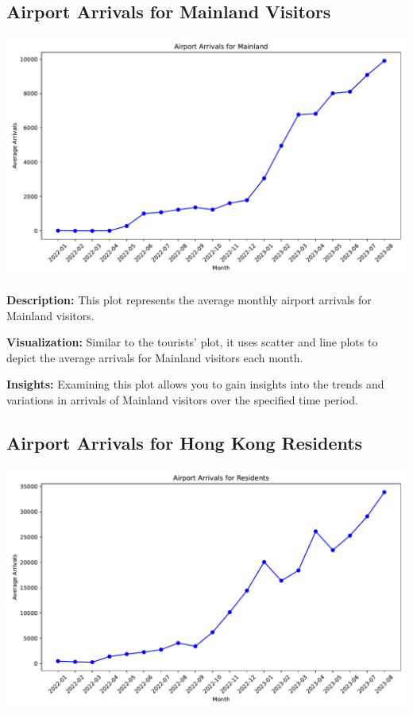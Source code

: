 \documentclass{article}
\begin{document}
\subsection{Airport Arrivals for Mainland Visitors}
\includegraphics[width=\textwidth]{mainland_arrivals.pdf}

\textbf{Description:} This plot represents the average monthly airport arrivals for Mainland visitors.

\textbf{Visualization:} Similar to the tourists' plot, it uses scatter and line plots to depict the average arrivals for Mainland visitors each month.

\textbf{Insights:} Examining this plot allows you to gain insights into the trends and variations in arrivals of Mainland visitors over the specified time period.


\subsection{Airport Arrivals for Hong Kong Residents}
\includegraphics[width=\textwidth]{residents_arrivals.pdf}
\end{document}
